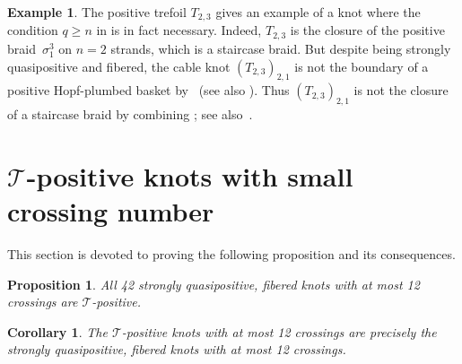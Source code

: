 \documentclass{amsart}
\theoremstyle{definition}
\newtheorem{example}[definition]{Example}
\theoremstyle{remark}
\newtheorem{remark}[definition]{Remark}%
\theoremstyle{plain}
\newtheorem{proposition}[definition]{Proposition}
\newtheorem{corollary}[definition]{Corollary}
\newcommand{\T}{\mathcal{T}}
\begin{document}
\begin{example}\label{ex:cable_converse}
The positive trefoil $T_{2,3}$ gives an example of a knot where the condition $q \geq n$ in  is in fact necessary. Indeed, $T_{2,3}$ is the closure of the positive braid~$\sigma_1^3$ on $n=2$ strands, which is a staircase braid. But despite being strongly quasipositive and fibered, the cable knot $(T_{2,3})_{2,1}$ is not the boundary of a positive Hopf-plumbed basket by~\cite{melvin_morton} (see also ). Thus $(T_{2,3})_{2,1}$ is not the closure of a staircase braid by combining ; see also~\cite[Corollary~5.3]{banfield}.
\end{example}


\section{\texorpdfstring{$\T$-positive}{T-positive} knots with small crossing number}\label{sec:crossing_nr}

This section is devoted to proving the following proposition and its consequences.

\begin{proposition}\label{prop:sqp_fib_12_cross_sec}
    All 42 strongly quasipositive, fibered knots with at most 12 crossings are $\T$-positive.
\end{proposition}

\begin{corollary}\label{cor:T-pos_12cross}
    The $\T$-positive knots with at most 12 crossings are precisely the strongly quasipositive, fibered knots with at most 12 crossings. 
\end{corollary}
\end{document}

